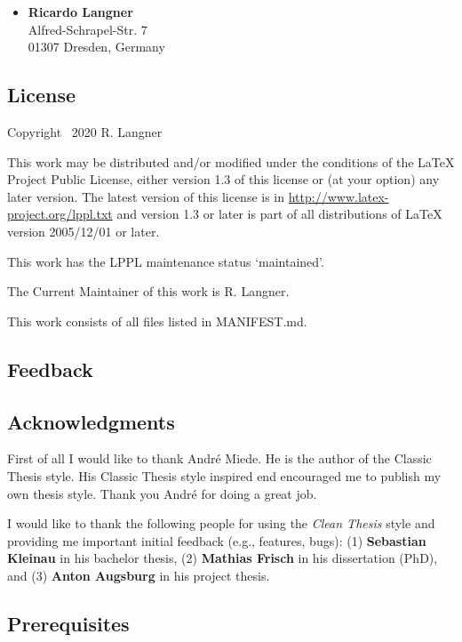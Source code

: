 \documentclass{ltxdockit}
\newcommand*{\cleanthesis}{\emph{Clean Thesis}\xspace}
\begin{document}
\begin{itemize}
\item \textbf{Ricardo Langner} \\
Alfred-Schrapel-Str. 7 \\
01307 Dresden, Germany
\end{itemize}

\subsection{License}
\label{sec:intro:license}

Copyright \textcopyright\ 2020 R. Langner

This work may be distributed and/or modified under the
conditions of the LaTeX Project Public License, either version 1.3
of this license or (at your option) any later version.
The latest version of this license is in
  \url{http://www.latex-project.org/lppl.txt}
and version 1.3 or later is part of all distributions of LaTeX
version 2005/12/01 or later.

This work has the LPPL maintenance status `maintained'.

The Current Maintainer of this work is R. Langner.

This work consists of all files listed in MANIFEST.md.

\subsection{Feedback}
\label{sec:intro:feedback}

\subsection{Acknowledgments}
\label{sec:intro:ack}

First of all I would like to thank André Miede. He is the author of the Classic Thesis style. His Classic Thesis style inspired end encouraged me to publish my own thesis style. Thank you André for doing a great job.

I would like to thank the following people for using the \cleanthesis style and providing me important initial feedback (e.g., features, bugs): (1) \textbf{Sebastian Kleinau} in his bachelor thesis, (2) \textbf{Mathias Frisch} in his dissertation (PhD), and (3) \textbf{Anton Augsburg} in his project thesis.

\subsection{Prerequisites}
\label{sec:intro:pre}
\end{document}
